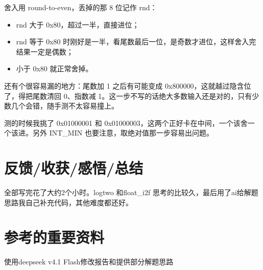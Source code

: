 \documentclass[UTF8,a4paper,11pt,fontset=windows]{ctexart}
\begin{document}
舍入用 round-to-even，丢掉的那 8 位记作 rnd：

\begin{itemize}
  \item rnd 大于 0x80，超过一半，直接进位；
  \item rnd 等于 0x80 时刚好是一半，看尾数最后一位，是奇数才进位，这样舍入完结果一定是偶数；
  \item 小于 0x80 就正常舍掉。
\end{itemize}

还有个很容易漏的地方：尾数加 1 之后有可能变成 0x800000，这就越过隐含位了，得把尾数清回 0、指数减 1。这一步不写的话绝大多数输入还是对的，只有少数几个会错，随手测不太容易撞上。

测的时候我挑了 0x01000001 和 0x01000003，这两个正好卡在中间，一个该舍一个该进。另外 INT\_MIN 也要注意，取绝对值那一步容易出问题。

\section{反馈/收获/感悟/总结}

全部写完花了大约2个小时。logtwo 和float\_i2f 思考的比较久，最后用了ai给解题思路我自己补充代码，其他难度都还好。

\section{参考的重要资料}

使用deepseek v4.1 Flash修改报告和提供部分解题思路
\end{document}
